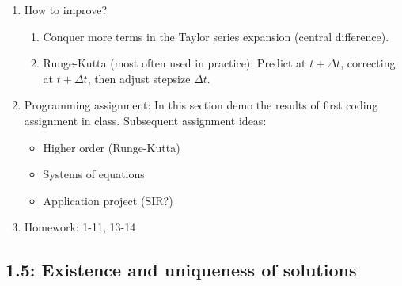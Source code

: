 \documentclass{article}
\begin{document}
\begin{enumerate}
\item How to improve?
\begin{enumerate}
\item Conquer more terms in the Taylor series expansion (central difference).
\item Runge-Kutta (most often used in practice): Predict at $t+\Delta t$, correcting at $t+\Delta t$, then adjust stepsize $\Delta t$. 
\end{enumerate}

\item Programming assignment: In this section demo the results of first coding assignment in class. Subsequent assignment ideas:
\begin{itemize}
\item Higher order (Runge-Kutta)
\item Systems of equations
\item Application project (SIR?)
\end{itemize}


\item Homework: 1-11, 13-14

\end{enumerate}



\subsection{1.5: Existence and uniqueness of solutions}
\end{document}
